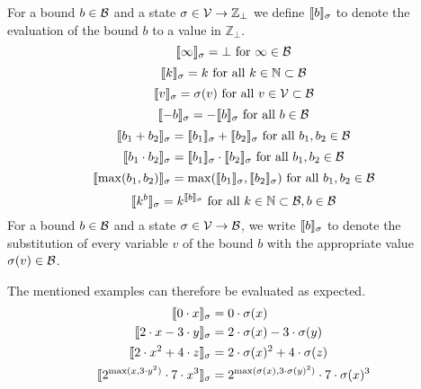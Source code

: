 \begin{definition}
  For a bound $b \in \mathcal{B}$ and a state $\sigma \in \mathcal{V} \rightarrow \mathbb{Z}_\bot$ we define $\llbracket b \rrbracket_{\sigma}$ to denote the evaluation of the bound $b$ to a value in $\mathbb{Z}_\bot$.
  \[ \llbracket \infty \rrbracket_{\sigma} = \bot \text{ for } \infty \in \mathcal{B} \]
  \[ \llbracket k \rrbracket_{\sigma} = k \text{ for all } k \in \mathbb{N} \subset \mathcal{B} \] 
  \[ \llbracket v \rrbracket_{\sigma} = \sigma(v) \text{ for all } v \in \mathcal{V} \subset \mathcal{B} \] 
  \[ \llbracket -b \rrbracket_{\sigma} = -\llbracket b \rrbracket_{\sigma} \text{ for all } b \in \mathcal{B} \] 
  \[ \llbracket b_1 + b_2 \rrbracket_{\sigma} = \llbracket b_1 \rrbracket_{\sigma} + \llbracket b_2 \rrbracket_{\sigma} \text{ for all } b_1, b_2 \in \mathcal{B} \] 
  \[ \llbracket b_1 \cdot b_2 \rrbracket_{\sigma} = \llbracket b_1 \rrbracket_{\sigma} \cdot \llbracket b_2 \rrbracket_{\sigma} \text{ for all } b_1, b_2 \in \mathcal{B} \] 
  \[ \llbracket \max(b_1, b_2) \rrbracket_{\sigma} = \max(\llbracket b_1 \rrbracket_{\sigma}, \llbracket b_2 \rrbracket_{\sigma}) \text{ for all } b_1, b_2 \in \mathcal{B} \]
  \[ \llbracket k^b \rrbracket_{\sigma} = k^{\llbracket b \rrbracket_{\sigma}} \text{ for all } k \in \mathbb{N} \subset \mathcal{B}, b \in \mathcal{B} \]  
  For a bound $b \in \mathcal{B}$ and a state $\sigma \in \mathcal{V} \rightarrow \mathcal{B}$, we write $\llbracket b \rrbracket_{\sigma}$ to denote the substitution of every variable $v$ of the bound $b$ with the appropriate value $\sigma(v) \in \mathcal{B}$.
\end{definition}
The mentioned examples can therefore be evaluated as expected.
\begin{align*}
  \llbracket 0 \cdot x \rrbracket_{\sigma} &= 0 \cdot \sigma(x) \\
  \llbracket 2 \cdot x - 3 \cdot y \rrbracket_{\sigma} &= 2 \cdot \sigma(x) - 3 \cdot \sigma(y) \\
  \llbracket 2 \cdot x^2 + 4 \cdot z \rrbracket_{\sigma} &= 2 \cdot \sigma(x)^2 + 4 \cdot \sigma(z) \\
  \llbracket 2^{\max(x,3 \cdot y^2)} \cdot 7 \cdot x^3 \rrbracket_{\sigma} &= 2^{\max(\sigma(x),3 \cdot \sigma(y)^2)} \cdot 7 \cdot \sigma(x)^3
\end{align*}

